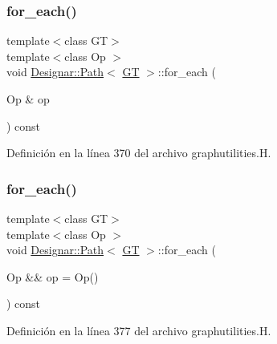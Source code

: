 \subsubsection{\texorpdfstring{for\+\_\+each()}{for\_each()}\hspace{0.1cm}{\footnotesize\ttfamily [1/4]}}
{\footnotesize\ttfamily template$<$class GT$>$ \\
template$<$class Op $>$ \\
void \hyperlink{class_designar_1_1_path}{Designar\+::\+Path}$<$ \hyperlink{demo-buildgraph_8_c_a3001c40d2c31ca87ed96cd7d1334a55e}{GT} $>$\+::for\+\_\+each (\begin{DoxyParamCaption}\item[{Op \&}]{op }\end{DoxyParamCaption}) const\hspace{0.3cm}{\ttfamily [inline]}}



Definición en la línea 370 del archivo graphutilities.\+H.

\mbox{\label{class_designar_1_1_path_acc53d7be8093a53e860e283bcf96593f}} 
\subsubsection{\texorpdfstring{for\+\_\+each()}{for\_each()}\hspace{0.1cm}{\footnotesize\ttfamily [2/4]}}
{\footnotesize\ttfamily template$<$class GT$>$ \\
template$<$class Op $>$ \\
void \hyperlink{class_designar_1_1_path}{Designar\+::\+Path}$<$ \hyperlink{demo-buildgraph_8_c_a3001c40d2c31ca87ed96cd7d1334a55e}{GT} $>$\+::for\+\_\+each (\begin{DoxyParamCaption}\item[{Op \&\&}]{op = {\ttfamily Op()} }\end{DoxyParamCaption}) const\hspace{0.3cm}{\ttfamily [inline]}}



Definición en la línea 377 del archivo graphutilities.\+H.

\mbox{\label{class_designar_1_1_path_a3cfa609d28037e6da0ee380150369c7a}} 

